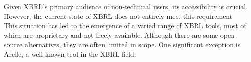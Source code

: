 Given XBRL's primary audience of non-technical users, its accessibility is crucial.
However, the current state of XBRL does not entirely meet this requirement.
This situation has led to the emergence of a varied range of XBRL tools,
most of which are proprietary and not freely available.
Although there are some open-source alternatives,
they are often limited in scope.
One significant exception is Arelle\cite{arelle}, a well-known tool in the XBRL field.


